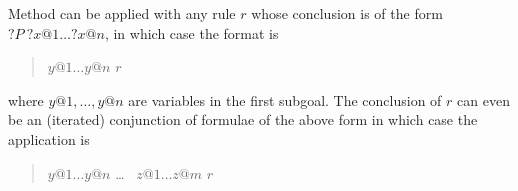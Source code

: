 \begin{isabellebody}
\begin{isamarkuptext}
Method  can be applied with any rule $r$
whose conclusion is of the form ${?}P~?x@1 \dots ?x@n$, in which case the
format is
\begin{quote}
 $y@1 \dots y@n$  $r$\isa{{\isacharparenright}}
\end{quote}%
where $y@1, \dots, y@n$ are variables in the first subgoal.
The conclusion of $r$ can even be an (iterated) conjunction of formulae of
the above form in which case the application is
\begin{quote}
 $y@1 \dots y@n$  \dots\  $z@1 \dots z@m$  $r$\isa{{\isacharparenright}}
\end{quote}


\end{isamarkuptext}
\end{isabellebody}
